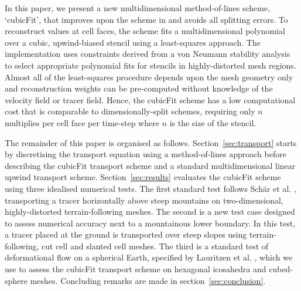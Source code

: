 In this paper, we present a new multidimensional method-of-lines scheme, `cubicFit', that improves upon the scheme in \citep{weller-shahrokhi2014} and avoids all splitting errors.  To reconstruct values at cell faces, the scheme fits a multidimensional polynomial over a cubic, upwind-biased stencil using a least-squares approach.  The implementation uses constraints derived from a von Neumann stability analysis to select appropriate polynomial fits for stencils in highly-distorted mesh regions.  Almost all of the least-squares procedure depends upon the mesh geometry only and reconstruction weights can be pre-computed without knowledge of the velocity field or tracer field.  Hence, the cubicFit scheme has a low computational cost that is comparable to dimensionally-split schemes, requiring only $n$ multiplies per cell face per time-step where $n$ is the size of the stencil.

The remainder of this paper is organised as follows.
Section~\ref{sec:transport} starts by discretising the transport equation using a method-of-lines approach before describing the cubicFit transport scheme and a standard multidimensional linear upwind transport scheme.
Section~\ref{sec:results} evaluates the cubicFit scheme using three idealised numerical tests.
The first standard test follows Sch\"ar et al. \citep{schaer2002}, transporting a tracer horizontally above steep mountains on two-dimensional, highly-distorted terrain-following meshes.
The second is a new test case designed to assess numerical accuracy next to a mountainous lower boundary.  In this test, a tracer placed at the ground is transported over steep slopes using terrain-following, cut cell and slanted cell meshes.
The third is a standard test of deformational flow on a spherical Earth, specified by Lauritzen et al. \citep{lauritzen2012}, which we use to assess the cubicFit transport scheme on hexagonal icosahedra and cubed-sphere meshes.
Concluding remarks are made in section~\ref{sec:conclusion}.

